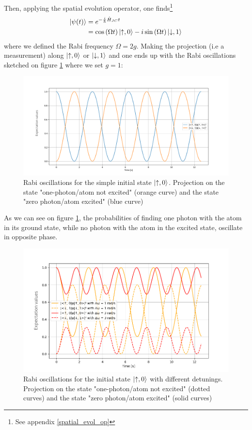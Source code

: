 \documentclass[11pt]{report}
\DeclarePairedDelimiter\ket{\lvert}{\rangle}
\begin{document}
Then, applying the spatial evolution operator, one finds\footnote{See appendix \ref{spatial_evol_op}}
\begin{align}
\ket{\psi(t)} &= e^{-\frac{i}{\hbar}\hat{H}_{JC}t}\\
&= \cos\left(\Omega t\right) \ket{\uparrow, 0} - i \sin\left(\Omega t\right) \ket{\downarrow, 1}
\end{align}
where we defined the Rabi frequency $\Omega = 2g$. Making the projection (i.e a measurement) along $\ket{\uparrow, 0}$ or $\ket{\downarrow, 1}$ and one ends up with the Rabi oscillations sketched on figure  \ref{fig:rabi-no-delta} where we set $g=1$:

\begin{figure}[h]
\centering
\includegraphics[width=\textwidth]{rabi-no-delta}
\caption{Rabi oscillations for the simple initial state $\ket{\uparrow, 0}$. Projection on the state "one-photon/atom not excited" (orange curve) and the state "zero photon/atom excited" (blue curve)}
\label{fig:rabi-no-delta}
\end{figure}

As we can see on figure \ref{fig:rabi-no-delta}, the probabilities of finding one photon with the atom in its ground state, while no photon with the atom in the excited state, oscillate in opposite phase.

\begin{figure}[h!]
\centering
\includegraphics[width=\textwidth]{rabi-prog-delta}
\caption{Rabi oscillations for the initial state $\ket{\uparrow, 0}$ with different detunings. Projection on the state "one-photon/atom not excited" (dotted curves) and the state "zero photon/atom excited" (solid curves)}
\label{fig:rabi-prog-delta}
\end{figure}
\end{document}
